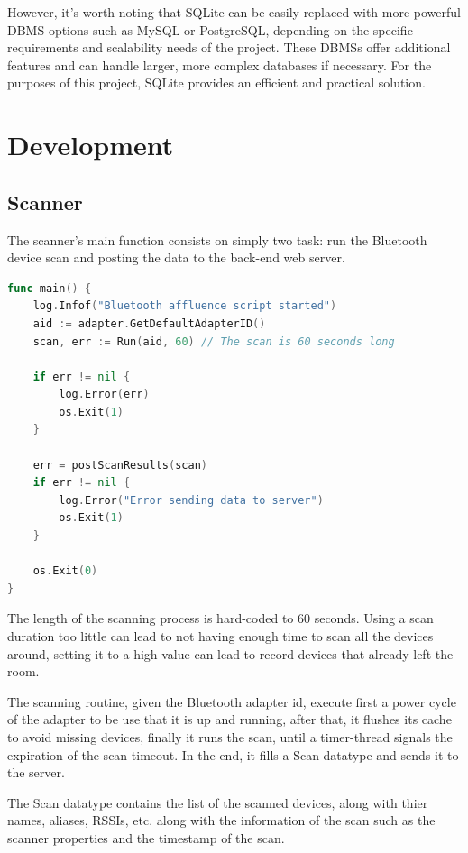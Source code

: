\documentclass[a4paper, 11pt]{article}
\begin{document}
However, it's worth noting that SQLite can be easily replaced with more powerful DBMS options such as MySQL or PostgreSQL, depending on the specific requirements and scalability needs of the project. These DBMSs offer additional features and can handle larger, more complex databases if necessary. For the purposes of this project, SQLite provides an efficient and practical solution.

\newpage

\section{Development}
\subsection{Scanner}
The scanner's main function consists on simply two task: run the Bluetooth device scan and posting the data to the back-end web server.

\begin{lstlisting}[language=Go]
func main() {
	log.Infof("Bluetooth affluence script started")
	aid := adapter.GetDefaultAdapterID()
	scan, err := Run(aid, 60) // The scan is 60 seconds long
	
	if err != nil {
		log.Error(err)
		os.Exit(1)
	}

	err = postScanResults(scan)
	if err != nil {
		log.Error("Error sending data to server")
		os.Exit(1)
	}

	os.Exit(0)
}

\end{lstlisting}

The length of the scanning process is hard-coded to 60 seconds. Using a scan duration too little can lead to not having enough time to scan all the devices around, setting it to a high value can lead to record devices that already left the room.

The scanning routine, given the Bluetooth adapter id, execute first a power cycle of the adapter to be use that it is up and running, after that, it flushes its cache to avoid missing devices, finally it runs the scan, until a timer-thread signals the expiration of the scan timeout. In the end, it fills a Scan datatype and sends it to the server.

The Scan datatype contains the list of the scanned devices, along with thier names, aliases, RSSIs, etc. along with the information of the scan such as the scanner properties and the timestamp of the scan.
\end{document}
